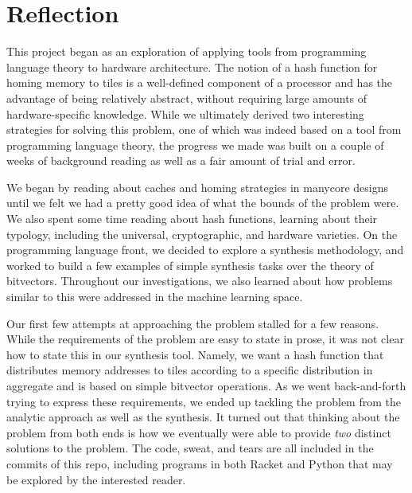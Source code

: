 
\section{Reflection}
\label{sec:Reflection}

This project began as an exploration of applying tools from programming language
theory to hardware architecture.  The notion of a hash function for homing
memory to tiles is a well-defined component of a processor and has the advantage
of being relatively abstract, without requiring large amounts of
hardware-specific knowledge.  While we ultimately derived two interesting
strategies for solving this problem, one of which was indeed based on a tool
from programming language theory, the progress we made was built on a couple of
weeks of background reading as well as a fair amount of trial and error.

We began by reading about caches and homing strategies in manycore designs until
we felt we had a pretty good idea of what the bounds of the problem were.  We
also spent some time reading about hash functions, learning about their
typology, including the universal, cryptographic, and hardware varieties.  On
the programming language front, we decided to explore a synthesis methodology,
and worked to build a few examples of simple synthesis tasks over the theory of
bitvectors.  Throughout our investigations, we also learned about how problems
similar to this were addressed in the machine learning space.

Our first few attempts at approaching the problem stalled for a few reasons.
While the requirements of the problem are easy to state in prose, it was not
clear how to state this in our synthesis tool.  Namely, we want a hash function
that distributes memory addresses to tiles according to a specific distribution
in aggregate and is based on simple bitvector operations.  As we went
back-and-forth trying to express these requirements, we ended up tackling the
problem from the analytic approach as well as the synthesis.  It turned out that
thinking about the problem from both ends is how we eventually were able to
provide \textit{two} distinct solutions to the problem.  The code, sweat, and tears are
all included in the commits of this repo, including programs in both Racket and
Python that may be explored by the interested reader.


